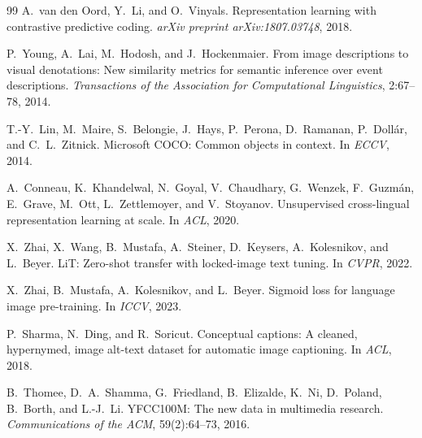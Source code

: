 \documentclass[10pt,a4paper]{ctexart}
\begin{document}
\begin{thebibliography}{99}
A.~van den Oord, Y.~Li, and O.~Vinyals.
\newblock Representation learning with contrastive predictive coding.
\newblock \textit{arXiv preprint arXiv:1807.03748}, 2018.

P.~Young, A.~Lai, M.~Hodosh, and J.~Hockenmaier.
\newblock From image descriptions to visual denotations: New similarity metrics for semantic inference over event descriptions.
\newblock \textit{Transactions of the Association for Computational Linguistics}, 2:67--78, 2014.

T.-Y.~Lin, M.~Maire, S.~Belongie, J.~Hays, P.~Perona, D.~Ramanan, P.~Dollár, and C.~L.~Zitnick.
\newblock Microsoft COCO: Common objects in context.
\newblock In \textit{ECCV}, 2014.

A.~Conneau, K.~Khandelwal, N.~Goyal, V.~Chaudhary, G.~Wenzek, F.~Guzmán, E.~Grave, M.~Ott, L.~Zettlemoyer, and V.~Stoyanov.
\newblock Unsupervised cross-lingual representation learning at scale.
\newblock In \textit{ACL}, 2020.

X.~Zhai, X.~Wang, B.~Mustafa, A.~Steiner, D.~Keysers, A.~Kolesnikov, and L.~Beyer.
\newblock LiT: Zero-shot transfer with locked-image text tuning.
\newblock In \textit{CVPR}, 2022.

X.~Zhai, B.~Mustafa, A.~Kolesnikov, and L.~Beyer.
\newblock Sigmoid loss for language image pre-training.
\newblock In \textit{ICCV}, 2023.

P.~Sharma, N.~Ding, and R.~Soricut.
\newblock Conceptual captions: A cleaned, hypernymed, image alt-text dataset for automatic image captioning.
\newblock In \textit{ACL}, 2018.

B.~Thomee, D.~A.~Shamma, G.~Friedland, B.~Elizalde, K.~Ni, D.~Poland, B.~Borth, and L.-J.~Li.
\newblock YFCC100M: The new data in multimedia research.
\newblock \textit{Communications of the ACM}, 59(2):64--73, 2016.


\end{thebibliography}
\end{document}
